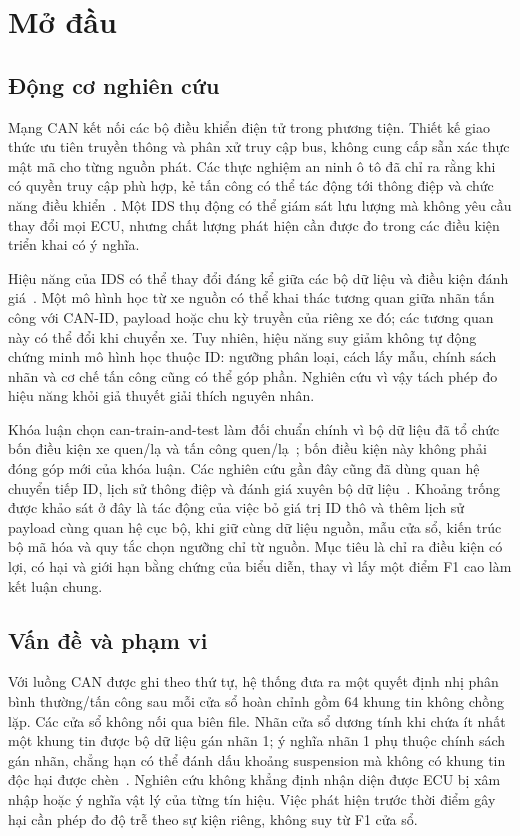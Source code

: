 \documentclass[12pt,a4paper,oneside,openany]{extbook}
\begin{document}
\chapter{Mở đầu}\label{chap:introduction}
\section{Động cơ nghiên cứu}
Mạng CAN kết nối các bộ điều khiển điện tử trong phương tiện. Thiết kế giao thức ưu tiên truyền thông và phân xử truy cập bus, không cung cấp sẵn xác thực mật mã cho từng nguồn phát. Các thực nghiệm an ninh ô tô đã chỉ ra rằng khi có quyền truy cập phù hợp, kẻ tấn công có thể tác động tới thông điệp và chức năng điều khiển~\cite{koscher2010experimental,checkoway2011comprehensive}. Một IDS thụ động có thể giám sát lưu lượng mà không yêu cầu thay đổi mọi ECU, nhưng chất lượng phát hiện cần được đo trong các điều kiện triển khai có ý nghĩa.

Hiệu năng của IDS có thể thay đổi đáng kể giữa các bộ dữ liệu và điều kiện đánh giá~\cite{koltai2026trust}. Một mô hình học từ xe nguồn có thể khai thác tương quan giữa nhãn tấn công với CAN-ID, payload hoặc chu kỳ truyền của riêng xe đó; các tương quan này có thể đổi khi chuyển xe. Tuy nhiên, hiệu năng suy giảm không tự động chứng minh mô hình học thuộc ID: ngưỡng phân loại, cách lấy mẫu, chính sách nhãn và cơ chế tấn công cũng có thể góp phần. Nghiên cứu vì vậy tách phép đo hiệu năng khỏi giả thuyết giải thích nguyên nhân.

Khóa luận chọn can-train-and-test làm đối chuẩn chính vì bộ dữ liệu đã tổ chức bốn điều kiện xe quen/lạ và tấn công quen/lạ~\cite{lampe2024curated}; bốn điều kiện này không phải đóng góp mới của khóa luận. Các nghiên cứu gần đây cũng đã dùng quan hệ chuyển tiếp ID, lịch sử thông điệp và đánh giá xuyên bộ dữ liệu~\cite{khreasat2026relational,dong2026mtff,koltai2026trust}. Khoảng trống được khảo sát ở đây là tác động của việc bỏ giá trị ID thô và thêm lịch sử payload cùng quan hệ cục bộ, khi giữ cùng dữ liệu nguồn, mẫu cửa sổ, kiến trúc bộ mã hóa và quy tắc chọn ngưỡng chỉ từ nguồn. Mục tiêu là chỉ ra điều kiện có lợi, có hại và giới hạn bằng chứng của biểu diễn, thay vì lấy một điểm F1 cao làm kết luận chung.

\section{Vấn đề và phạm vi}
Với luồng CAN được ghi theo thứ tự, hệ thống đưa ra một quyết định nhị phân bình thường/tấn công sau mỗi cửa sổ hoàn chỉnh gồm 64 khung tin không chồng lặp. Các cửa sổ không nối qua biên file. Nhãn cửa sổ dương tính khi chứa ít nhất một khung tin được bộ dữ liệu gán nhãn 1; ý nghĩa nhãn 1 phụ thuộc chính sách gán nhãn, chẳng hạn có thể đánh dấu khoảng suspension mà không có khung tin độc hại được chèn~\cite{rajapaksha2024canmirgu}. Nghiên cứu không khẳng định nhận diện được ECU bị xâm nhập hoặc ý nghĩa vật lý của từng tín hiệu. Việc phát hiện trước thời điểm gây hại cần phép đo độ trễ theo sự kiện riêng, không suy từ F1 cửa sổ.
\end{document}
